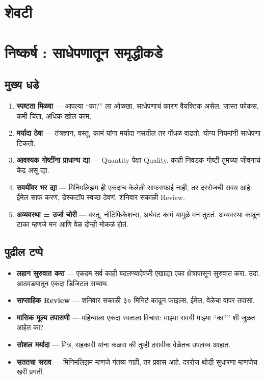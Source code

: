 \chapter*{शेवटी }

\chapter{निष्कर्ष : साधेपणातून समृद्धीकडे}

\section*{मुख्य धडे}

\begin{enumerate}
  \item \textbf{स्पष्टता मिळवा} — आपल्या “का?” ला ओळखा. साधेपणाचं कारण वैयक्तिक असेल: जास्त फोकस, कमी चिंता, अधिक खोल काम.  
  \item \textbf{मर्यादा ठेवा} — तंत्रज्ञान, वस्तू, कामं यांना मर्यादा नसतील तर गोंधळ वाढतो. योग्य नियमांनी साधेपणा टिकतो.  
  \item \textbf{आवश्यक गोष्टींना प्राधान्य द्या} — Quantity पेक्षा Quality. काही निवडक गोष्टी तुमच्या जीवनाचं केंद्र असू द्या.  
  \item \textbf{सवयींवर भर द्या} — मिनिमलिझम ही एकदाच केलेली साफसफाई नाही, तर दररोजची सवय आहे: ईमेल साफ करणं, डेस्कटॉप स्वच्छ ठेवणं, शनिवार सकाळी Review.  
  \item \textbf{अव्यवस्था = उर्जा चोरी} — वस्तू, नोटिफिकेशन्स, अर्धवट कामं यामुळे मन तुटतं. अव्यवस्था काढून टाका म्हणजे मन आणि वेळ दोन्ही मोकळं होतं.  
\end{enumerate}

\section*{पुढील टप्पे}

\begin{itemize}
  \item \textbf{लहान सुरुवात करा} — एकदम सर्व काही बदलण्याऐवजी एखाद्या एका क्षेत्रापासून सुरुवात करा. उदा. आठवड्यातून एकदा डिजिटल सब्बाथ.  
  \item \textbf{साप्ताहिक Review} — शनिवार सकाळी ३० मिनिटं काढून फाइल्स, ईमेल, वेळेचा वापर तपासा.  
  \item \textbf{मासिक मूल्य तपासणी} — महिन्याला एकदा स्वतःला विचारा: माझ्या सवयी माझ्या “का?” शी जुळत आहेत का?  
  \item \textbf{सोशल मर्यादा} — मित्र, सहकारी यांना कळवा की तुम्ही ठरावीक वेळेतच उपलब्ध आहात.  
  \item \textbf{सततचा सराव} — मिनिमलिझम म्हणजे गंतव्य नाही, तर प्रवास आहे. दररोज थोडी सुधारणा म्हणजेच खरी प्रगती.  
\end{itemize}


